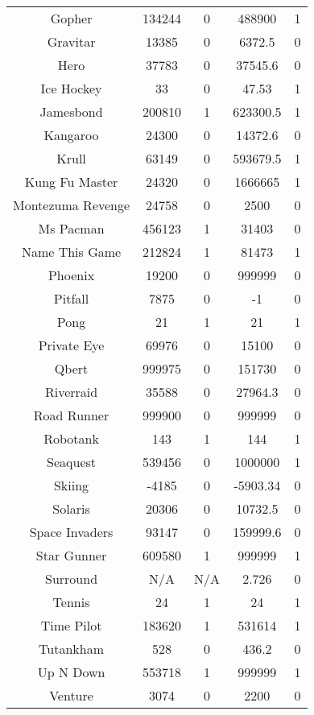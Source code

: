 \begin{table}[!hb]
\begin{center}
\begin{tabular}{c cc cc }
        Gopher & 134244 & 0  & 488900 & 1  \\  
        Gravitar & 13385 & 0  & 6372.5 & 0  \\  
        Hero & 37783 & 0  & 37545.6 & 0  \\  
        Ice Hockey & 33 & 0  & 47.53 & 1  \\  
        Jamesbond & 200810 & 1  & 623300.5 & 1  \\  
        Kangaroo & 24300 & 0  & 14372.6 & 0  \\  
        Krull & 63149 & 0  & 593679.5 & 1  \\  
        Kung Fu Master & 24320 & 0  & 1666665 & 1  \\  
        Montezuma Revenge & 24758 & 0  & 2500 & 0  \\  
        Ms Pacman & 456123 & 1  & 31403 & 0  \\  
        Name This Game & 212824 & 1  & 81473 & 1  \\  
        Phoenix & 19200 & 0  & 999999 & 0  \\  
        Pitfall & 7875 & 0  & -1 & 0  \\  
        Pong & 21 & 1  & 21 & 1  \\  
        Private Eye & 69976 & 0  & 15100 & 0  \\  
        Qbert & 999975 & 0  & 151730 & 0  \\  
        Riverraid & 35588 & 0  & 27964.3 & 0  \\  
        Road Runner & 999900 & 0  & 999999 & 0  \\  
        Robotank & 143 & 1  & 144 & 1  \\  
        Seaquest & 539456 & 0  & 1000000 & 1  \\  
        Skiing & -4185 & 0  & -5903.34 & 0  \\  
        Solaris & 20306 & 0  & 10732.5 & 0  \\  
        Space Invaders & 93147 & 0  & 159999.6 & 0  \\  
        Star Gunner & 609580 & 1  & 999999 & 1  \\  
        Surround & N/A & N/A & 2.726 & 0  \\  
        Tennis & 24 & 1  & 24 & 1  \\  
        Time Pilot & 183620 & 1  & 531614 & 1  \\  
        Tutankham & 528 & 0  & 436.2 & 0  \\  
        Up N Down & 553718 & 1  & 999999 & 1  \\  
        Venture & 3074 & 0  & 2200 & 0  \\  

\end{tabular}
\end{center}
\end{table}
